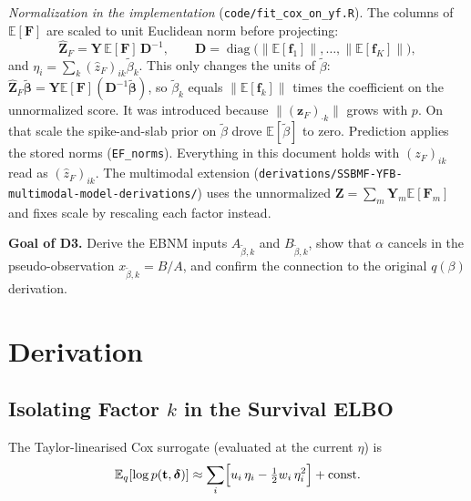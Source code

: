 \documentclass[11pt]{article}
\newcommand{\E}{\mathbb{E}}
\begin{document}
\smallskip
\emph{Normalization in the implementation} (\texttt{code/fit\_cox\_on\_yf.R}). The
columns of $\E[\mathbf{F}]$ are scaled to unit Euclidean norm before projecting:
\[
  \hat{\mathbf{Z}}_F = \mathbf{Y}\,\E[\mathbf{F}]\,\mathbf{D}^{-1},\qquad
  \mathbf{D} = \operatorname{diag}\bigl(\lVert\E[\mathbf{f}_1]\rVert,\dots,\lVert\E[\mathbf{f}_K]\rVert\bigr),
\]
and $\eta_i = \sum_k(\hat z_F)_{ik}\tilde\beta_k$. This only changes the units of
$\tilde\beta$: $\hat{\mathbf{Z}}_F\tilde{\boldsymbol\beta} = \mathbf{Y}\E[\mathbf{F}]
(\mathbf{D}^{-1}\tilde{\boldsymbol\beta})$, so $\tilde\beta_k$ equals
$\lVert\E[\mathbf{f}_k]\rVert$ times the coefficient on the unnormalized score. It was
introduced because $\lVert(\mathbf{z}_F)_{\cdot k}\rVert$ grows with $p$. On that scale
the spike-and-slab prior on $\tilde\beta$ drove $\E[\tilde\beta]$ to zero. Prediction
applies the stored norms (\texttt{EF\_norms}). Everything in this document holds with
$(z_F)_{ik}$ read as $(\hat z_F)_{ik}$. The multimodal extension
(\texttt{derivations/SSBMF-YFB-multimodal-model-derivations/}) uses the unnormalized
$\mathbf{Z}=\sum_m\mathbf{Y}_m\E[\mathbf{F}_m]$ and fixes scale by rescaling each factor
instead.

\bigskip
\textbf{Goal of D3.} Derive the EBNM inputs $A_{\tilde\beta,k}$ and $B_{\tilde\beta,k}$,
show that $\alpha$ cancels in the pseudo-observation $x_{\tilde\beta,k} = B/A$, and
confirm the connection to the original $q(\beta)$ derivation.

\section{Derivation}

\subsection{Isolating Factor $k$ in the Survival ELBO}

The Taylor-linearised Cox surrogate (evaluated at the current $\eta$) is
\[
  \E_q[\log p(\mathbf{t}, \boldsymbol{\delta})] \approx
  \sum_i \Bigl[ u_i\,\eta_i - \tfrac{1}{2}w_i\,\eta_i^2 \Bigr] + \text{const}.
\]
\end{document}
